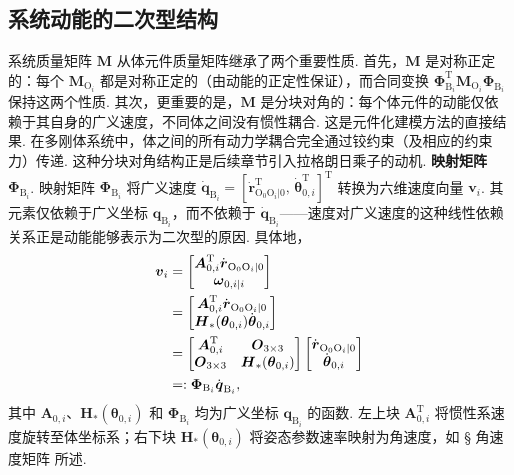 \subsection{系统动能的二次型结构}
系统质量矩阵 $\boldsymbol{M}$ 从体元件质量矩阵继承了两个重要性质. 首先，$\boldsymbol{M}$ 是对称正定的：每个 $\boldsymbol{M}_{\text{O}_i}$ 都是对称正定的（由动能的正定性保证），而合同变换 $\boldsymbol{\Phi}_{\text{B}_i}^\text{T} \boldsymbol{M}_{\text{O}_i} \boldsymbol{\Phi}_{\text{B}_i}$ 保持这两个性质. 其次，更重要的是，$\boldsymbol{M}$ 是分块对角的：每个体元件的动能仅依赖于其自身的广义速度，不同体之间没有惯性耦合. 这是元件化建模方法的直接结果. 在多刚体系统中，体之间的所有动力学耦合完全通过铰约束（及相应的约束力）传递. 这种分块对角结构正是后续章节引入拉格朗日乘子的动机.
\textbf{映射矩阵 $\boldsymbol{\Phi}_{\text{B}_i}$}.
映射矩阵 $\boldsymbol{\Phi}_{\text{B}_i}$ 将广义速度 $\dot{\boldsymbol{q}}_{\text{B}_i} = [\dot{\boldsymbol{r}}_{\text{O}_0\text{O}_i|0}^\text{T},\, \dot{\boldsymbol{\theta}}_{0,i}^\text{T}]^\text{T}$ 转换为六维速度向量 $\boldsymbol{v}_i$. 其元素仅依赖于广义坐标 $\boldsymbol{q}_{\text{B}_i}$，而不依赖于 $\dot{\boldsymbol{q}}_{\text{B}_i}$——速度对广义速度的这种线性依赖关系正是动能能够表示为二次型的原因. 具体地，
\begin{align*}\boldsymbol{v}_i &= \begin{bmatrix} \boldsymbol{A}_{0,i}^\text{T} \dot{\boldsymbol{r}}_{\text{O}_0\text{O}_i|0} \\ \boldsymbol{\omega}_{0,i|i} \end{bmatrix} \notag \\
    &= \begin{bmatrix} \boldsymbol{A}_{0,i}^\text{T} \dot{\boldsymbol{r}}_{\text{O}_0\text{O}_i|0} \\ \boldsymbol{H}_*(\boldsymbol{\theta}_{0,i}) \dot{\boldsymbol{\theta}}_{0,i} \end{bmatrix} \notag \\
    &= \begin{bmatrix} \boldsymbol{A}_{0,i}^\text{T} & \boldsymbol{O}_{3\times 3} \\ \boldsymbol{O}_{3\times 3} & \boldsymbol{H}_*(\boldsymbol{\theta}_{0,i}) \end{bmatrix} \begin{bmatrix} \dot{\boldsymbol{r}}_{\text{O}_0\text{O}_i|0} \\ \dot{\boldsymbol{\theta}}_{0,i} \end{bmatrix} \notag \\
    &=: \boldsymbol{\Phi}_{\text{B}_i} \dot{\boldsymbol{q}}_{\text{B}_i},\end{align*}
其中 $\boldsymbol{A}_{0,i}$、$\boldsymbol{H}_*(\boldsymbol{\theta}_{0,i})$ 和 $\boldsymbol{\Phi}_{\text{B}_i}$ 均为广义坐标 $\boldsymbol{q}_{\text{B}_i}$ 的函数. 左上块 $\boldsymbol{A}_{0,i}^\text{T}$ 将惯性系速度旋转至体坐标系；右下块 $\boldsymbol{H}_*(\boldsymbol{\theta}_{0,i})$ 将姿态参数速率映射为角速度，如 § 角速度矩阵 所述.
